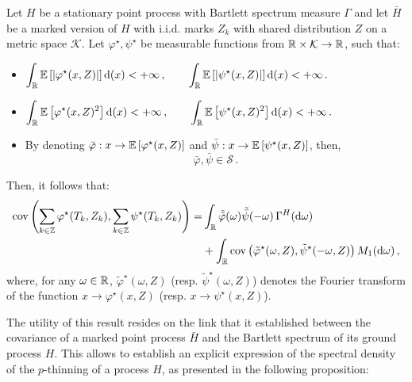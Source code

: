 \begin{theorem}\label{th:chap5_spectral_marked}
    Let $H$ be a stationary point process with Bartlett spectrum measure $\Gamma$ and 
    let $\bar H$ be a marked version of $H$ with i.i.d. marks $Z_k$ with shared distribution $Z$ on a metric space $\mathcal{K}$.
    Let $\varphi^\star, \psi^\star$ be measurable functions from ${\mathbb R} \times \mathcal{K} \to {\mathbb R}$, 
    such that:
    \begin{itemize}
        \item $\displaystyle
            \int_{{\mathbb R}}{{\mathbb E}\left[|\varphi^\star(x, Z)|\right]{\mathrm{d}}(x)} < +\infty\,,\qquad \int_{{\mathbb R}}{{\mathbb E}\left[|\psi^\star(x, Z)|\right]{\mathrm{d}}(x)} < +\infty\,.
        $
        \item $\displaystyle
            \int_{{\mathbb R}}{{\mathbb E}\left[\varphi^\star(x, Z)^2\right]{\mathrm{d}}(x)} < +\infty\,,\qquad\int_{{\mathbb R}}{{\mathbb E}\left[\psi^\star(x, Z)^2\right]{\mathrm{d}}(x)} < +\infty\,.
        $
        \item By denoting $\bar \varphi : x\to {\mathbb E}\left[\varphi^\star(x, Z)\right]$ and $\bar \psi : x\to {\mathbb E}\left[\psi^\star(x, Z)\right]$, then,
              \[\bar \varphi,\bar \psi \in\mathcal{S}\,.\]
    \end{itemize}

    Then, it follows that:
    \begin{align}\label{eq:chap5_marked_spectrum}
        \operatorname{cov}\left(\sum_{k\in{\mathbb Z}}{\varphi^\star(T_k, Z_k)}, \sum_{k\in{\mathbb Z}}{\psi^\star(T_k, Z_k)}\right) =& 
        \int_{{\mathbb R}}{\tilde {\bar\varphi} (\omega) \tilde{\bar \psi} (-\omega)\,\Gamma^H({\mathrm{d}} \omega)} \\
        &+ \int_{{\mathbb R}}{\operatorname{cov}\left( \tilde \varphi^\star(\omega, Z), \tilde \psi^\star (-\omega, Z)\right)M_1({\mathrm{d}} \omega)}\nonumber\,,
    \end{align}
    where, for any $\omega\in{\mathbb R}$, $\tilde \varphi^\star(\omega, Z)$ (resp. $\tilde \psi^\star(\omega, Z)$) denotes the Fourier transform of the function $x\to \varphi^\star(x, Z)$ (resp. $x\to \psi^\star(x, Z)$).
\end{theorem}

The utility of this result resides on the link that it established between the covariance of a marked point process $\bar H$
and the Bartlett spectrum of its ground process $H$. 
This allows to establish an explicit expression of the spectral density of the $p$-thinning of a process $H$, 
as presented in the following proposition:

